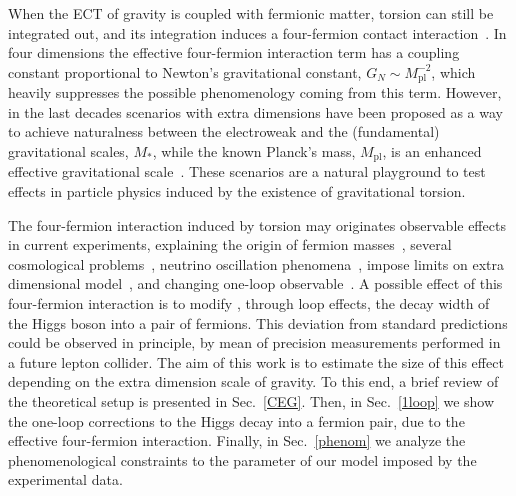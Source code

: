 \documentclass{ws-mpla}
\renewcommand{\(}{\left(}
\renewcommand{\)}{\right)}
\renewcommand{\[}{\left[}
\renewcommand{\]}{\right]}
\begin{document}
When the ECT of gravity is coupled with fermionic matter, torsion can still be integrated out, and its integration induces a four-fermion contact interaction~\cite{Kibble:1961ba,Hehl:1976kj,Shapiro:2001rz,Hammond:2002rm,SUGRA-book}. In four dimensions the effective four-fermion interaction term has a coupling constant proportional to Newton's gravitational constant, $G_N\sim M_{\text{pl}}^{-2}$, which heavily suppresses the possible phenomenology coming from this term.
However, in the last decades scenarios with extra dimensions have been proposed as a way to achieve naturalness between the electroweak and the (fundamental) gravitational scales, $M_*$, while the known Planck's mass, $M_{\text{pl}}$, is an enhanced effective gravitational scale~\cite{ADD1,AADD,ADD2,RS1,RS2}. These scenarios are a natural playground to test effects in particle physics induced by the existence of gravitational torsion.



The four-fermion interaction induced by torsion may originates observable effects in current experiments,\cite{Belyaev:1997zv,Belyaev:1998ax,Belyaev:2007fn} explaining the origin of fermion masses~\cite{Castillo-Felisola:2013jva}, several cosmological problems~\cite{Puetzfeld:2004yg,Capozziello:2009mq,Poplawski:2010jv,Poplawski:2010kb,Poplawski:2011xf,Poplawski:2011wj,Fabbri:2012yg,Vignolo:2014wva}, neutrino oscillation phenomena~\cite{Capozziello:2013dja}, impose limits on extra dimensional model~\cite{Chang:2000yw,Lebedev:2002dp,CCSZ,Castillo-Felisola:2014iia}, and changing one-loop observable~\cite{Lebedev:2002dp,Castillo-Felisola:2014xba}. A possible  effect of this four-fermion interaction is to modify , through loop effects, the decay width of the Higgs boson into a pair of fermions. This deviation from standard predictions could be observed in principle, by mean of precision measurements performed in a future lepton collider. The  aim of this work is to estimate the size of this effect depending on the extra dimension scale of gravity. To this end, a brief review of the theoretical setup is presented in Sec.~\ref{CEG}. Then, in Sec.~\ref{1loop} we show the one-loop corrections to the Higgs decay into a fermion pair, due to the effective four-fermion interaction. Finally, in Sec.~\ref{phenom} we analyze the phenomenological constraints to the parameter of our model imposed by the experimental data.
\end{document}

